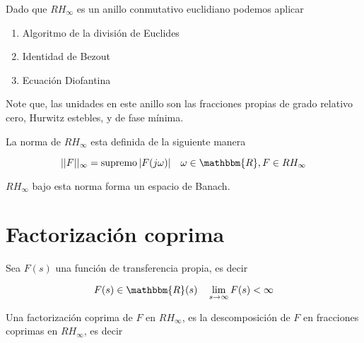         Dado que $RH_{\infty}$ es un anillo conmutativo euclidiano podemos aplicar

        \begin{enumerate}
            \item Algoritmo de la división de Euclides
            \item Identidad de Bezout
            \item Ecuación Diofantina
        \end{enumerate}

        Note que, las unidades en este anillo son las fracciones propias de grado relativo cero, Hurwitz estebles, y de fase mínima.

        \begin{definicion}
            La norma de $RH_{\infty}$ esta definida de la siguiente manera

            \begin{equation}
                ||F||_{\infty} = \supremo{|F(j\omega)|} \quad \omega \in \mathbbm{R}, F \in RH_{\infty}
            \end{equation}

            $RH_{\infty}$ bajo esta norma forma un espacio de Banach.
        \end{definicion}




    \section{Factorización coprima}

        Sea $F(s)$ una función de transferencia propia, es decir

        \begin{equation*}
            F(s) \in \mathbbm{R}(s) \quad \lim_{s \to \infty} F(s) < \infty
        \end{equation*}

        Una factorización coprima de $F$ en $RH_{\infty}$, es la descomposición de $F$ en fracciones coprimas en $RH_{\infty}$, es decir

